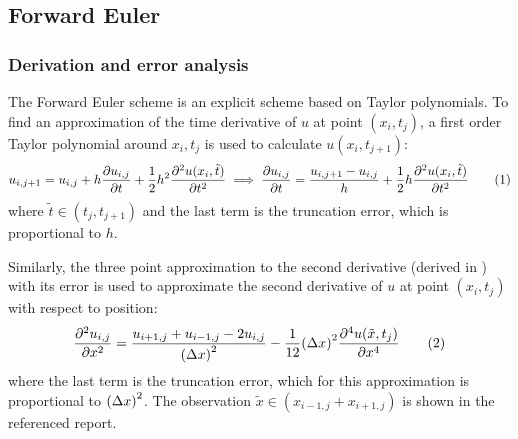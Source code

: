 \documentclass[12pt,english,a4paper]{article}
\newcommand{\eqtag}[1]{\refstepcounter{equation}\tag{\theequation}\label{#1}}
\begin{document}
\subsection{Forward Euler}

\subsubsection{Derivation and error analysis}\label{sec:ForwardEulerDerivation}
The Forward Euler scheme is an explicit scheme based on Taylor polynomials. To find an approximation of the time derivative of \(u\) at point \((x_i,t_j)\), a first order Taylor polynomial around \(x_i,t_j\) is used to calculate \(u(x_i,t_{j+1})\):
\[
    u_{i,j+1} = u_{i,j} + h\pdv{u_{i,j}}{t} + \frac{1}{2}h^2\pdv[2]{u(x_i,\tilde{t})}{t}
    \implies \pdv{u_{i,j}}{t} = \frac{u_{i,j+1}-u_{i,j}}{h} + \frac{1}{2}h\pdv[2]{u(x_i,\tilde{t})}{t}\eqtag{asymmnewton}
\]
where \(\tilde{t}\in(t_j,t_{j+1})\) and the last term is the truncation error, which is proportional to \(h\).

Similarly, the three point approximation to the second derivative (derived in \autocite{oblig1}) with its error is used to approximate the second derivative of \(u\) at point \((x_i,t_j)\) with respect to position:
\[
    \pdv[2]{u_{i,j}}{x} = \frac{u_{i+1,j} + u_{i-1,j} - 2u_{i,j}}{\qty(\Delta x)^2} - \frac{1}{12}\qty(\Delta x)^2\pdv[4]{u(\tilde{x},t_j)}{x}\eqtag{andrederivert}
\]
where the last term is the truncation error, which for this approximation is proportional to \(\qty(\Delta x)^2\). The observation \(\tilde{x}\in(x_{i-1,j} + x_{i+1,j})\) is shown in the referenced report.
\end{document}
